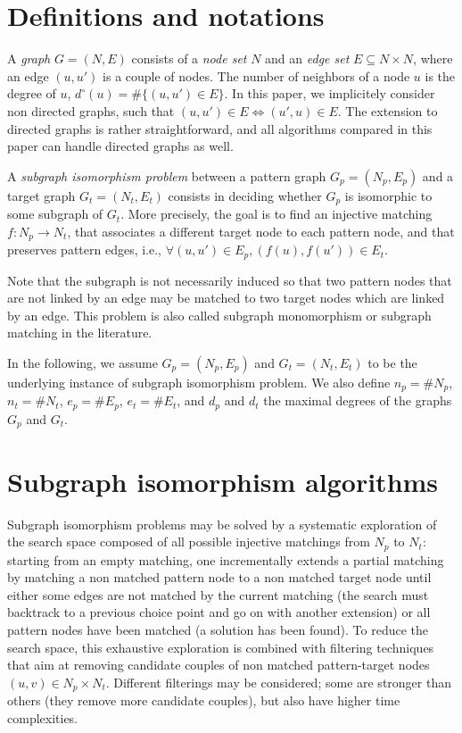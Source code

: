\documentclass{llncs}
\begin{document}
\section{Definitions and notations}

A \emph{graph} $G=(N,E)$ consists of a \emph{node set} $N$ and an \emph{edge set} $E \subseteq N \times N$, where an edge $(u,u')$ is a couple of nodes. The number of neighbors of a node $u$ is the degree of $u$, $d^\circ(u)=\#\{ (u,u')\in E\}$. In this paper, we implicitely consider non directed graphs, such that $(u,u')\in E\Leftrightarrow (u',u)\in E$. The extension to directed graphs is rather straightforward, and all algorithms compared in this paper can handle directed graphs as well.
   
A \emph{subgraph isomorphism problem} between a pattern graph $G_p=(N_p,E_p)$ and a target graph $G_t=(N_t,E_t)$ consists in deciding whether $G_p$ is isomorphic to some subgraph of $G_t$. More precisely, the goal is to find an injective matching $f: N_p\rightarrow N_t$, that associates a different target node to each pattern node, and that preserves pattern edges, i.e., $\forall (u,u') \in E_p, (f(u),f(u')) \in E_t$.

Note that the subgraph is not necessarily induced so that two pattern nodes that are not linked by an edge may be matched to two target nodes which are linked by an edge. This problem is also called subgraph monomorphism or subgraph matching in the literature. 

In the following, we assume $G_p=(N_p,E_p)$ and $G_t=(N_t,E_t)$ to be the underlying instance of subgraph isomorphism problem. 
We also define $n_p = \# N_p$, $n_t = \# N_t$,  $e_p=\# E_p$, $e_t=\# E_t$, and $d_p$ and $d_t$ the maximal degrees of the graphs $G_p$ and $G_t$. 


\section{Subgraph isomorphism algorithms}

Subgraph isomorphism problems may be solved by a systematic exploration of the search space composed of all possible injective matchings from $N_p$ to $N_t$: starting from an empty matching, one incrementally extends a partial matching by matching a non matched pattern node to a non matched target node until either some edges are not matched by the current matching (the search must backtrack to a previous choice point and go on with another extension) or all pattern nodes have been matched (a solution has been found). To reduce the search space, this exhaustive exploration is combined with filtering techniques that aim at removing candidate couples of non matched pattern-target nodes $(u,v)\in N_p\times N_t$. Different filterings may be considered; some are stronger than others (they remove more candidate couples), but also have higher time complexities.
\end{document}
